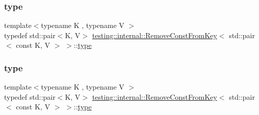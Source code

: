 \subsubsection{\texorpdfstring{type}{type}\hspace{0.1cm}{\footnotesize\ttfamily [1/3]}}
{\footnotesize\ttfamily template$<$typename K , typename V $>$ \\
typedef std\+::pair$<$K, V$>$ \mbox{\hyperlink{structtesting_1_1internal_1_1_remove_const_from_key}{testing\+::internal\+::\+Remove\+Const\+From\+Key}}$<$ std\+::pair$<$ const K, V $>$ $>$\+::\mbox{\hyperlink{structtesting_1_1internal_1_1_remove_const_from_key_3_01std_1_1pair_3_01const_01_k_00_01_v_01_4_01_4_ac1d76274964aa8172889a4714246e86f}{type}}}

\mbox{\label{structtesting_1_1internal_1_1_remove_const_from_key_3_01std_1_1pair_3_01const_01_k_00_01_v_01_4_01_4_ac1d76274964aa8172889a4714246e86f}} 
\subsubsection{\texorpdfstring{type}{type}\hspace{0.1cm}{\footnotesize\ttfamily [2/3]}}
{\footnotesize\ttfamily template$<$typename K , typename V $>$ \\
typedef std\+::pair$<$K, V$>$ \mbox{\hyperlink{structtesting_1_1internal_1_1_remove_const_from_key}{testing\+::internal\+::\+Remove\+Const\+From\+Key}}$<$ std\+::pair$<$ const K, V $>$ $>$\+::\mbox{\hyperlink{structtesting_1_1internal_1_1_remove_const_from_key_3_01std_1_1pair_3_01const_01_k_00_01_v_01_4_01_4_ac1d76274964aa8172889a4714246e86f}{type}}}

\mbox{\label{structtesting_1_1internal_1_1_remove_const_from_key_3_01std_1_1pair_3_01const_01_k_00_01_v_01_4_01_4_ac1d76274964aa8172889a4714246e86f}} 
